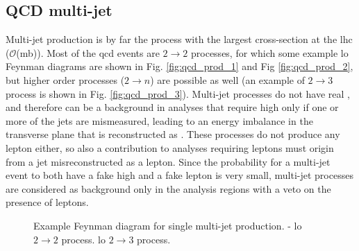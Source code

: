 \subsection{QCD multi-jet}

Multi-jet production is by far the process with the largest cross-section at the \gls{lhc} ($\mathcal{O}$(mb)). 
Most of the \gls{qcd} events are $2 \to 2$ processes, for which some example \gls{lo} Feynman diagrams are shown in Fig. \ref{fig:qcd_prod_1} and Fig \ref{fig:qcd_prod_2}, but higher order processes ($2 \to n$) are possible as well (an example of $2 \to 3$ process is shown in Fig. \ref{fig:qcd_prod_3}). 
Multi-jet processes do not have real \met, and therefore can be a background in analyses that require high \met only if one or more of the jets are mismeasured, leading to an energy imbalance in the transverse plane that is reconstructed as \met. 
These processes do not produce any lepton either, so also a contribution to analyses requiring leptons must origin from a jet misreconstructed as a lepton. 
Since the probability for a multi-jet event to both have a fake high \met and a fake lepton is very small, multi-jet processes are considered as background only in the analysis regions with a veto on the presence of leptons. 


\begin{figure}[h]
\centering 
{}
\caption{Example Feynman diagram for single multi-jet production. - \gls{lo} $2 \to 2$ process. 
 \gls{lo} $2 \to 3$ process.}\label{fig:qcd_prod}
\end{figure}

